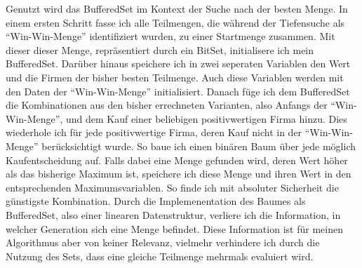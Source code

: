 Genutzt wird das BufferedSet im Kontext der Suche nach der besten Menge. In einem ersten Schritt fasse ich alle Teilmengen, die während der Tiefensuche als "`Win-Win-Menge"' identifiziert wurden, zu einer Startmenge zusammen. Mit dieser dieser Menge, repräsentiert durch ein BitSet, initialisere ich mein BufferedSet. Darüber hinaus speichere ich in zwei seperaten Variablen den Wert und die Firmen der bisher besten Teilmenge. Auch diese Variablen werden mit den Daten der "`Win-Win-Menge"' initialisiert. 
Danach füge ich dem BufferedSet die Kombinationen aus den bisher errechneten Varianten, also Anfangs der "`Win-Win-Menge"', und dem Kauf einer beliebigen positivwertigen Firma hinzu. Dies wiederhole ich für jede positivwertige Firma, deren Kauf nicht in der "`Win-Win-Menge"' berücksichtigt wurde. So baue ich einen binären Baum über jede möglich Kaufentscheidung auf. Falls dabei eine Menge gefunden wird, deren Wert höher als das bisherige Maximum ist, speichere ich diese Menge und ihren Wert in den entsprechenden Maximumsvariablen. So finde ich mit absoluter Sicherheit die günstigste Kombination. Durch die Implemenentation des Baumes als BufferedSet, also einer linearen Datenstruktur, verliere ich die Information, in welcher Generation sich eine Menge befindet. Diese Information ist für meinen Algorithmus aber von keiner Relevanz, vielmehr verhindere ich durch die Nutzung des Sets, dass eine gleiche Teilmenge mehrmals evaluiert wird.